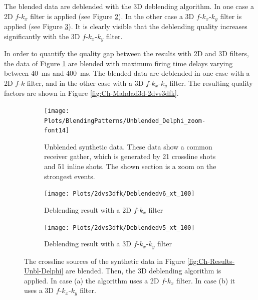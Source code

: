 The blended data are deblended with the 3D deblending algorithm. In one case a 2D $f$-$k_x$ filter is applied (see Figure \ref{fig:Ch-Mahdad3d-Deblending-2dfk}). In the other case a 3D $f$-$k_x$-$k_y$ filter is applied (see Figure \ref{fig:Ch-Mahdad3d-Deblending-3dfk}). It is clearly visible that the deblending quality increases significantly with the 3D $f$-$k_x$-$k_y$ filter.

In order to quantify the quality gap between the results with 2D and 3D filters, the data of Figure \ref{fig:Ch-Mahdad3d-Unbl-Delphi} are blended with maximum firing time delays varying between \SI{40}{\milli\second} and \SI{400}{\milli\second}. The blended data are deblended in one case with a 2D $f$-$k$ filter, and in the other case with a 3D $f$-$k_x$-$k_y$ filter. The resulting quality factors are shown in Figure \ref{fig:Ch-Mahdad3d-2dvs3dfk}.

 
\begin{figure}
	
	\centering
	\begin{subfigure}[t]{0.8\textwidth}
		\centering
		\texttt{[image: Plots/BlendingPatterns/Unblended\_Delphi\_zoom-font14]}
		\caption{Unblended synthetic data. These data show a common receiver gather, which is generated by 21 crossline shots and 51 inline shots. The shown section is a zoom on the strongest events.}
		\label{fig:Ch-Mahdad3d-Unbl-Delphi}
	\end{subfigure}

	\par\bigskip

	\centering
	\begin{subfigure}[t]{0.8\textwidth}
		\texttt{[image: Plots/2dvs3dfk/Deblendedv6\_xt\_100]}
		\caption{Deblending result with a 2D $f$-$k_x$ filter}
		\label{fig:Ch-Mahdad3d-Deblending-2dfk}
	\end{subfigure}
	
	\par\bigskip
	
	\centering
	\begin{subfigure}[t]{0.8\textwidth}
		\texttt{[image: Plots/2dvs3dfk/Deblendedv5\_xt\_100]}
		\caption{Deblending result with a 3D $f$-$k_x$-$k_y$ filter}
		\label{fig:Ch-Mahdad3d-Deblending-3dfk}
	\end{subfigure}
	
	\caption{The crossline sources of the synthetic data in Figure \ref{fig:Ch-Results-Unbl-Delphi} are blended. Then, the 3D deblending algorithm is applied. In case (a) the algorithm uses a 2D $f$-$k_x$ filter. In case (b) it uses a 3D $f$-$k_x$-$k_y$ filter.}
	\label{fig:Ch-Mahdad3d-Deblending-2dvs3d-fk}
	
\end{figure}



